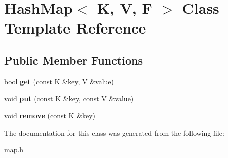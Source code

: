 \hypertarget{class_hash_map}{}\section{Hash\+Map$<$ K, V, F $>$ Class Template Reference}
\label{class_hash_map}
\subsection*{Public Member Functions}
\begin{DoxyCompactItemize}
\item 
\mbox{\label{class_hash_map_a627196a4ca1c6204f4db2188c52e537c}} 
bool {\bfseries get} (const K \&key, V \&value)
\item 
\mbox{\label{class_hash_map_abdd640f1913bdd84bc76b41ff5b4a2ae}} 
void {\bfseries put} (const K \&key, const V \&value)
\item 
\mbox{\label{class_hash_map_a1f62f6f46ee4312dae040b2fa7eca0ff}} 
void {\bfseries remove} (const K \&key)
\end{DoxyCompactItemize}


The documentation for this class was generated from the following file\+:\begin{DoxyCompactItemize}
\item 
map.\+h\end{DoxyCompactItemize}
